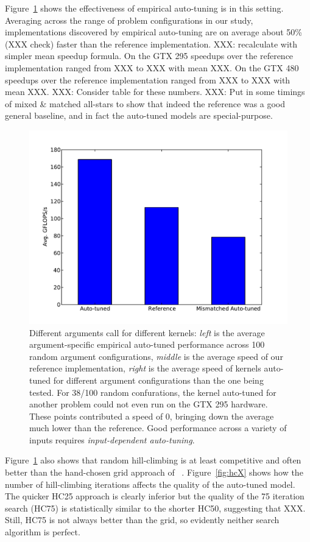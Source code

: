 \documentclass{sig-alternate}
\begin{document}
Figure~\ref{fig:speedup} shows the effectiveness of empirical auto-tuning is in this setting.  Averaging across the range of problem configurations in our study,
implementations discovered by empirical auto-tuning are on average about 50\% (XXX check) faster than the reference implementation.
XXX: recalculate with simpler mean speedup formula.
On the GTX 295 speedups over the reference implementation ranged from XXX to XXX with mean XXX.
On the GTX 480 speedups over the reference implementation ranged from XXX to XXX with mean XXX.
XXX: Consider table for these numbers.
XXX: Put in some timings of mixed \& matched all-stars to show that indeed the reference was a good general baseline, and in fact the auto-tuned models are special-purpose.
\begin{figure}
\centering
\includegraphics[scale=.42]{allstars_mixup_295.pdf}
\caption{Different arguments call for different kernels:
{\em left} is the average argument-specific empirical auto-tuned performance across 100 random argument configurations,
{\em middle} is the average speed of our reference implementation,
{\em right} is the average speed of kernels auto-tuned for different argument configurations than the one being tested.
For 38/100 random confurations, the kernel auto-tuned for another problem could not even run on the GTX 295 hardware.
These points contributed a speed of 0, bringing down the average much lower than the reference.
Good performance across a variety of inputs requires {\em input-dependent auto-tuning}.
}
\label{fig:speedup}
\end{figure}


Figure~\ref{fig:speedup} also shows that random hill-climbing is at least
competitive and often better than the hand-chosen grid approach of ~\citet{pinto+cox:2011gcg}.  Figure~\ref{fig:hcX} shows how the number of hill-climbing iterations
affects the quality of the auto-tuned model.
The quicker HC25 approach is clearly inferior but the quality of the 75 iteration search (HC75) is statistically similar to the shorter HC50, suggesting that XXX.
Still, HC75 is not always better than the grid, so evidently neither search algorithm is perfect.
\end{document}
